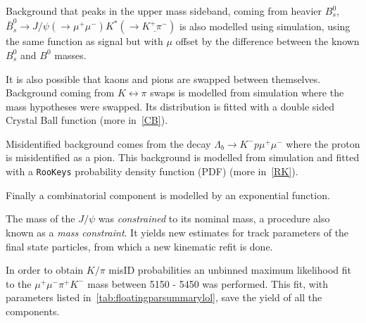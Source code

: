 Background that peaks in the upper mass sideband, coming from heavier $B^{0}_{s}$, $\bar{B}^{0}_{s} \rightarrow J/\psi (\rightarrow \mu^{+} \mu^{-}) K^*(\rightarrow \underline{K^{+} \pi^{-}})$ is also modelled using simulation, using the same function as signal but with $\mu$ offset by the difference between the known $B^{0}_{s}$ and $B^{0}$ masses.

It is also possible that kaons and pions are swapped between themselves. Background coming from $K \leftrightarrow \pi$ swaps is modelled from simulation where the mass hypotheses were swapped. Its distribution is fitted with a double sided Crystal Ball function \cite{Skwarnicki:1986xj} (more in~\autoref{CB}).

Misidentified background comes from the decay $\Lambda_{b} \rightarrow K^{-} p \mu^{+} \mu^{-}$ where the proton is misidentified as a pion. This background is modelled from simulation and fitted with a \texttt{RooKeys} probability density function (PDF) (more in~\autoref{RK}).

Finally a combinatorial component is modelled by an exponential function.


The mass of the $J/\psi$ was \textit{constrained} to its nominal mass, a procedure also known as a \textit{mass constraint}. It yields new estimates for track parameters of the final state particles, from which a new kinematic refit is done.

In order to obtain $K/\pi$ misID probabilities an unbinned maximum likelihood fit to the $\mu^{+} \mu^{-} \pi^{+} K^{-}$ mass between 5150 - 5450 \mevcc was performed. This fit, with parameters listed in~\autoref{tab:floatingparsummarylol}, save the yield of all the components. 

